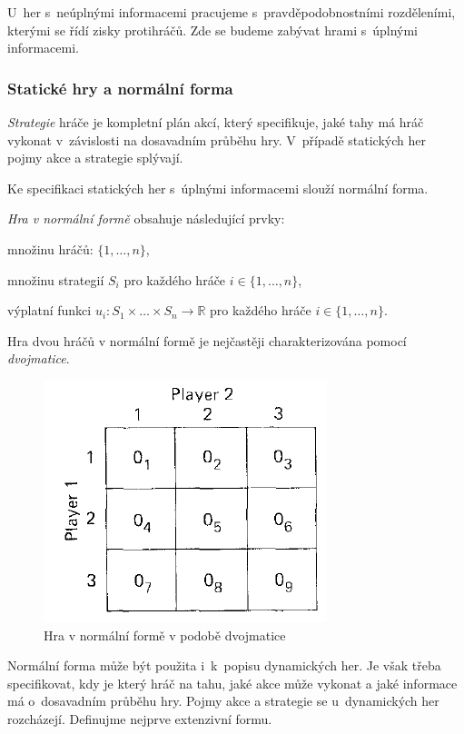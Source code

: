 \documentclass[a5paper,12pt]{article}
\begin{document}
    U~her s~neúplnými informacemi pracujeme s~pravděpodobnostními rozděleními, kterými se řídí zisky protihráčů. Zde se budeme zabývat hrami s~úplnými informacemi.
     
    \subsubsection{Statické hry a normální forma}
    \emph{Strategie} hráče je kompletní plán akcí, který specifikuje, jaké tahy má hráč vykonat v~závislosti na dosavadním průběhu hry. V~případě statických her pojmy akce a strategie splývají. 

    Ke specifikaci statických her s~úplnými informacemi slouží normální forma.

    \emph{Hra v normální formě} obsahuje následující prvky:
    \begin{compactitem}
    \item množinu hráčů: $\{1,\dots , n\}$,
    \item množinu strategií $S_i$ pro každého hráče $i \in \{1,\dots , n\}$,
    \item výplatní funkci $u_i : S_1 \times \dots \times S_n \rightarrow \mathbb{R}$ pro každého hráče $i \in \{1,\dots , n\}$.
    \end{compactitem}

    Hra dvou hráčů v normální formě je nejčastěji charakterizována pomocí \emph{dvojmatice}.

    \begin{figure}[htb]
    \centering
    \includegraphics[scale=0.35]{1_3.png}
    \caption{Hra v normální formě v podobě dvojmatice \label{bimatrix}}
    \end{figure}

    Normální forma může být použita i~k~popisu dynamických her. Je však třeba specifikovat, kdy je který hráč na tahu, jaké akce může vykonat a jaké informace má o~dosavadním průběhu hry. Pojmy akce a strategie se u~dynamických her rozcházejí. Definujme nejprve extenzivní formu.
\end{document}
